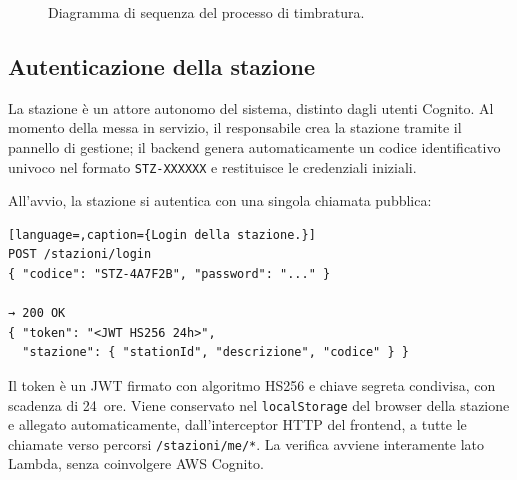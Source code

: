 \begin{figure}[ht]
\caption{Diagramma di sequenza del processo di timbratura.}
\label{fig:sequence-timbratura}
\end{figure}

\subsection{Autenticazione della stazione}
\label{subsec:auth-stazione}

La stazione è un attore autonomo del sistema, distinto dagli utenti
Cognito. Al momento della messa in servizio, il responsabile crea la
stazione tramite il pannello di gestione; il backend genera
automaticamente un codice identificativo univoco nel formato
\texttt{STZ-XXXXXX} e restituisce le credenziali iniziali.

All'avvio, la stazione si autentica con una singola chiamata pubblica:

\begin{lstlisting}[language=,caption={Login della stazione.}]
POST /stazioni/login
{ "codice": "STZ-4A7F2B", "password": "..." }

→ 200 OK
{ "token": "<JWT HS256 24h>",
  "stazione": { "stationId", "descrizione", "codice" } }
\end{lstlisting}

Il token è un JWT firmato con algoritmo \textsc{HS256} e chiave segreta
condivisa, con scadenza di 24~ore. Viene conservato nel \texttt{localStorage}
del browser della stazione e allegato automaticamente, dall'interceptor
HTTP del frontend, a tutte le chiamate verso percorsi \texttt{/stazioni/me/*}.
La verifica avviene interamente lato Lambda, senza coinvolgere AWS Cognito.

